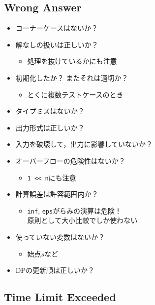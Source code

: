 \documentclass{jsarticle}
\begin{document}

\vbox{}\subsection*{Wrong Answer}

\begin{itemize}
\item コーナーケースはないか？
\item 解なしの扱いは正しいか？
  \begin{itemize}
  \item 処理を抜けているかにも注意
  \end{itemize}
\item 初期化したか？ またそれは適切か？
  \begin{itemize}
  \item とくに複数テストケースのとき
  \end{itemize}
\item タイプミスはないか？
\item 出力形式は正しいか？
\item 入力を破壊して，出力に影響していないか？
\item オーバーフローの危険性はないか？
  \begin{itemize}
  \item \verb|1 << n|にも注意
  \end{itemize}
\item 計算誤差は許容範囲内か？
  \begin{itemize}
  \item \verb|inf|, \verb|eps|がらみの演算は危険！ \\
    原則として大小比較でしか使わない
  \end{itemize}
\item 使っていない変数はないか？
  \begin{itemize}
  \item 始点$s$など
  \end{itemize}
\item DPの更新順は正しいか？
\end{itemize}

\subsection*{Time Limit Exceeded}
\end{document}

